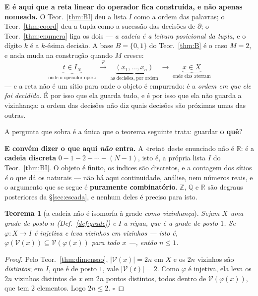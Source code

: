 \documentclass[11pt,a4paper]{article}
\newtheorem{teorema}{Teorema}
\begin{document}
\medskip\noindent\textbf{E é aqui que a reta linear do operador fica construída, e
não apenas nomeada.} O Teor.~\ref{thm:BI} deu a lista $I$ como a ordem das palavras;
o Teor.~\ref{thm:coord} deu a tupla como a sucessão das decisões de $\partial$; o
Teor.~\ref{thm:enumera} liga os dois --- \emph{a cadeia é a leitura posicional da
tupla}, e o dígito $k$ é a $k$-ésima decisão. A base $B=\{0,1\}$ do
Teor.~\ref{thm:B} é o caso $M=2$, e nada muda na construção quando $M$ cresce:
\[
\underbrace{t\in I_N}_{\text{onde o operador opera}}
\;\xrightarrow{\ \varphi\ }\;
\underbrace{(x_1,\dots,x_n)}_{\text{as decisões, por ordem}}
\;\xrightarrow{\ \ }\;
\underbrace{x\in X}_{\text{onde elas aterram}}
\]
--- e a reta não é um sítio para onde o objeto é empurrado: é a \emph{ordem em que
ele foi decidido}. É por isso que ela guarda tudo, e é por isso que ela não guarda
a vizinhança: a ordem das decisões não diz quais decisões são próximas umas das
outras.

\medskip\noindent A pergunta que sobra é a única que o teorema seguinte trata:
guardar \textbf{o quê}?

\medskip\noindent\textbf{E convém dizer o que aqui \emph{não} entra.} A «reta»
deste enunciado não é $\mathbb{R}$: é a \textbf{cadeia discreta}
$0-1-2-\cdots-(N-1)$, isto é, a própria lista $I$ do Teor.~\ref{thm:BI}. O objeto
é finito, os índices são discretos, e a contagem dos sítios \emph{é} o que dá os
naturais --- não há aqui continuidade, análise, nem números reais, e o argumento
que se segue é \textbf{puramente combinatório}. $\mathbb{Z}$, $\mathbb{Q}$ e $\mathbb{R}$
são degraus posteriores da §\ref{sec:escada}, e nenhum deles é preciso para isto.

\begin{teorema}[a cadeia não é isomorfa à grade \emph{como vizinhança}]\label{thm:viz-nao-iso}
Sejam $X$ uma grade de posto $n$ (Def.~\ref{def:grade}) e $I$ a régua, que é a
grade de posto $1$. Se $\varphi\colon X\to I$ é injetiva e leva vizinhos em
vizinhos --- isto é, $\varphi(\mathcal{V}(x))\subseteq\mathcal{V}(\varphi(x))$ para
todo $x$ ---, então $n\le1$.
\end{teorema}

\begin{proof}
Pelo Teor.~\ref{thm:dimensao}, $\lvert\mathcal{V}(x)\rvert=2n$ em $X$ e os $2n$
vizinhos são \emph{distintos}; em $I$, que é de posto $1$, vale
$\lvert\mathcal{V}(t)\rvert=2$. Como $\varphi$ é injetiva, ela leva os $2n$
vizinhos distintos de $x$ em $2n$ pontos distintos, todos dentro de
$\mathcal{V}(\varphi(x))$, que tem $2$ elementos. Logo $2n\le2$. $\square$
\end{proof}
\end{document}

